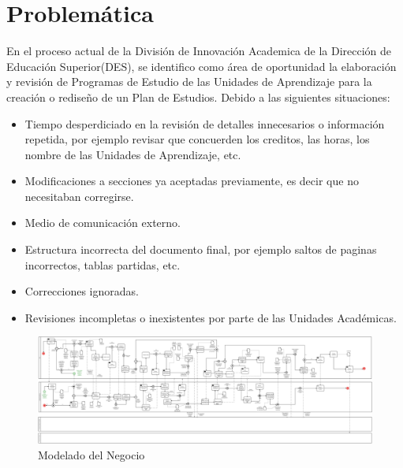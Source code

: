 \section{Problemática}
En el proceso actual de la División de Innovación Academica de la Dirección de Educación Superior(DES), se identifico como área de oportunidad la elaboración y revisión de Programas de Estudio de las Unidades de Aprendizaje para la creación o rediseño de un Plan de Estudios. Debido a las siguientes situaciones:\\
\begin{itemize}
    \item Tiempo desperdiciado en la revisión de detalles innecesarios o información repetida, por ejemplo revisar que concuerden los creditos, las horas, los nombre de las Unidades de Aprendizaje, etc.
    \item Modificaciones a secciones ya aceptadas previamente, es decir que no necesitaban corregirse.
    \item Medio de comunicación externo.
    \item Estructura incorrecta del documento final, por ejemplo saltos de paginas incorrectos, tablas partidas, etc.
    \item Correcciones ignoradas.
    \item Revisiones incompletas o inexistentes por parte de las Unidades Académicas.
\end{itemize}
\begin{figure}[H]
	\centering
	\includegraphics[width=0.9\linewidth]{images/Procesos/MacroProceso}
	\caption{Modelado del Negocio}
\end{figure}
